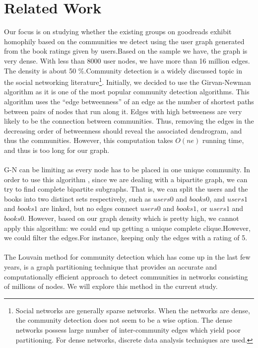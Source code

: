 \documentclass[11pt]{article}
\begin{document}
\section{Related Work}
Our focus is on studying whether the existing groups on goodreads exhibit homophily based on the communities we detect using the user graph generated from the book ratings given by users.Based on the sample we have, the graph is very dense. With less than 8000 user nodes, we have more than 16 million edges. The density is about 50 \%.Community detection is a widely discussed topic in the social networking literature\footnote{Social networks are generally sparse networks. When the networks are dense, the community detection does not seem to be a wise option. The dense networks possess large number of inter-community edges which yield poor partitioning. For dense networks, discrete data analysis techniques are used.}\cite{clauset}. Initially, we decided to use the Girvan-Newman algorithm as it is one of the most popular community detection algorithms\cite{newman}. This algorithm uses the ``edge betweenness'' of an edge as the number of shortest paths between pairs of nodes that run along it. Edges with high betweeness are very likely to be the connection between communities.
Thus, removing the edges in the decreasing order of betweenness should reveal the associated dendrogram, and thus the communities. However, this computation takes $O(ne)$ running time, and thus is too long for our graph.\\\\
G-N can be limiting as every node has to be placed in one unique community.
In order to use this algorithm , since we are dealing with a bipartite graph, we can try to find complete bipartite subgraphs. That is, we can split the users and the books into two distinct sets respectively, such as $users0$ and $books0$, and $users1$ and $books1$ are linked, but no edges connect $users0$ and $books1$, or $users1$ and $books0$. However, based on our graph density which is pretty high, we cannot apply this algorithm: we could end up getting a unique complete clique.However, we could filter the edges.For instance, keeping only the edges with a rating of 5.\\\\
The Louvain\cite{louvain} method for community detection which has come up in the last few years, is a graph partitioning technique that provides an accurate and computationally efficient approach to detect communities in networks consisting of millions of nodes. We will explore this method in the current study.
\end{document}
